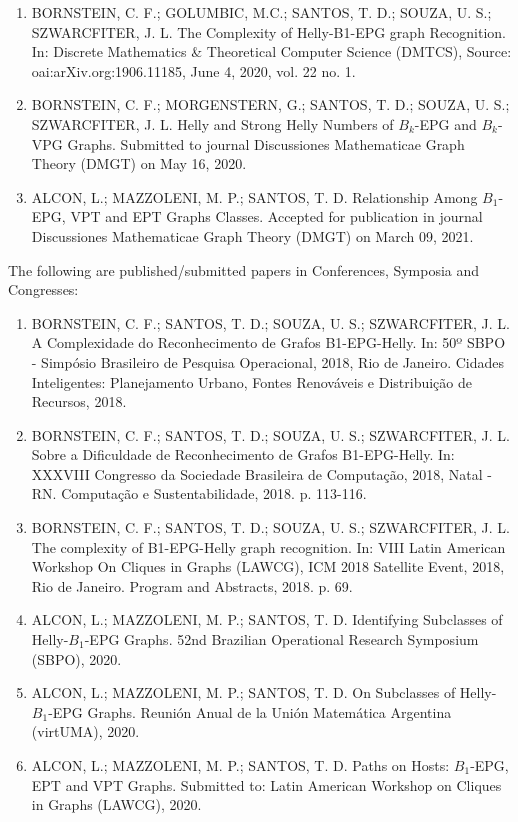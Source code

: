 \documentclass[12pt]{article}
\begin{document}
\begin{enumerate}
    
     \item BORNSTEIN, C. F.; GOLUMBIC, M.C.; SANTOS, T. D.; SOUZA, U. S.; SZWARCFITER, J. L.  The Complexity of Helly-B1-EPG graph Recognition. In: Discrete Mathematics \& Theoretical Computer Science (DMTCS), Source: oai:arXiv.org:1906.11185, June 4, 2020,  vol. 22 no. 1. 
     
     \item BORNSTEIN, C. F.; MORGENSTERN, G.; SANTOS, T. D.; SOUZA, U. S.; SZWARCFITER, J. L.  Helly and Strong Helly Numbers of $B_k$-EPG and $B_k$-VPG Graphs. Submitted to journal Discussiones Mathematicae Graph Theory (DMGT) on  May 16, 2020. 
 
     \item ALCON, L.; MAZZOLENI, M. P.;  SANTOS, T. D. Relationship Among $B_1$-EPG, VPT and EPT Graphs Classes. Accepted for publication in journal Discussiones Mathematicae Graph Theory (DMGT) on March 09, 2021.
\end{enumerate}

The following are  published/submitted papers in Conferences, Symposia and Congresses: 

\begin{enumerate}
    \item BORNSTEIN, C. F.; SANTOS, T. D.; SOUZA, U. S.; SZWARCFITER, J. L. A Complexidade do Reconhecimento de Grafos B1-EPG-Helly. In: 50º SBPO - Simpósio Brasileiro de Pesquisa Operacional, 2018, Rio de Janeiro. Cidades Inteligentes: Planejamento Urbano, Fontes Renováveis e Distribuição de Recursos, 2018.

     \item BORNSTEIN, C. F.; SANTOS, T. D.; SOUZA, U. S.; SZWARCFITER, J. L. Sobre a Dificuldade de Reconhecimento de Grafos B1-EPG-Helly. In: XXXVIII Congresso da Sociedade Brasileira de Computação, 2018, Natal - RN. Computação e Sustentabilidade, 2018. p. 113-116.

     
     \item BORNSTEIN, C. F.; SANTOS, T. D.; SOUZA, U. S.; SZWARCFITER, J. L. The complexity of B1-EPG-Helly graph recognition. In: VIII Latin American Workshop On Cliques in Graphs (LAWCG), ICM 2018 Satellite Event, 2018, Rio de Janeiro. Program and Abstracts, 2018. p. 69.
    
    \item ALCON, L.; MAZZOLENI, M. P.;  SANTOS, T. D. Identifying Subclasses of Helly-$B_1$-EPG Graphs.  52nd  Brazilian Operational Research Symposium (SBPO), 2020.
     
    \item ALCON, L.; MAZZOLENI, M. P.;  SANTOS, T. D. On Subclasses of Helly-$B_1$-EPG Graphs.   Reunión Anual de la Unión Matemática Argentina (virtUMA), 2020.
    
    \item ALCON, L.; MAZZOLENI, M. P.;  SANTOS, T. D. Paths on Hosts: $B_1$-EPG, EPT and VPT Graphs. Submitted to: 
    Latin American Workshop on Cliques in Graphs (LAWCG), 2020.
    
\end{enumerate}
\end{document}
